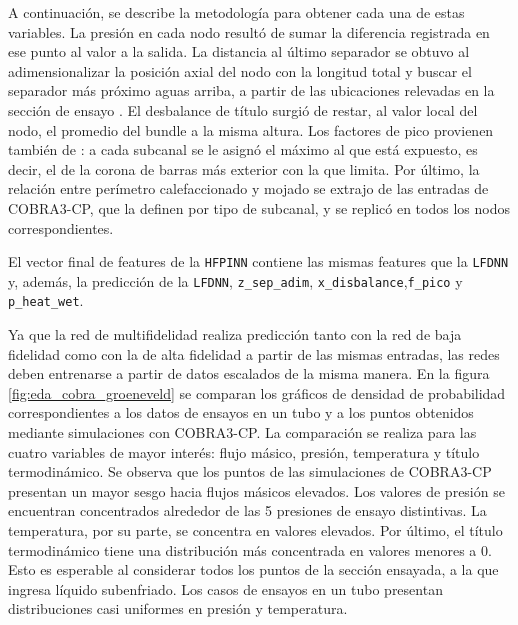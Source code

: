 A continuación, se describe la metodología para obtener cada una de estas variables. La presión en cada nodo resultó de sumar la diferencia registrada en ese punto al valor a la salida. La distancia al último separador se obtuvo al adimensionalizar la posición axial del nodo con la longitud total y buscar el separador más próximo aguas arriba, a partir de las ubicaciones relevadas en la sección de ensayo \citep{recopilacion_columbia}. El desbalance de título surgió de restar, al valor local del nodo, el promedio del bundle a la misma altura. Los factores de pico provienen también de \citep{recopilacion_columbia}: a cada subcanal se le asignó el máximo al que está expuesto, es decir, el de la corona de barras más exterior con la que limita. Por último, la relación entre perímetro calefaccionado y mojado se extrajo de las entradas de COBRA3-CP, que la definen por tipo de subcanal, y se replicó en todos los nodos correspondientes. 


El vector final de features de la \texttt{HFPINN} contiene las mismas features que la \texttt{LFDNN} y, además, la predicción de la \texttt{LFDNN}, \texttt{z\_sep\_adim}, \texttt{x\_disbalance},\break \texttt{f\_pico} y \texttt{p\_heat\_wet}.

Ya que la red de multifidelidad realiza predicción tanto con la red de baja fidelidad como con la de alta fidelidad a partir de las mismas entradas, las redes deben entrenarse a partir de datos escalados de la misma manera. En la figura \ref{fig:eda_cobra_groeneveld} se comparan los gráficos de densidad de probabilidad correspondientes a los datos de ensayos en un tubo y a los puntos obtenidos mediante simulaciones con COBRA3-CP. La comparación se realiza para las cuatro variables de mayor interés: flujo másico, presión, temperatura y título termodinámico. Se observa que los puntos de las simulaciones de COBRA3-CP presentan un mayor sesgo hacia flujos másicos elevados. Los valores de presión se encuentran concentrados alrededor de las 5 presiones de ensayo distintivas. La temperatura, por su parte, se concentra en valores elevados. Por último, el título termodinámico tiene una distribución más concentrada en valores menores a 0. Esto es esperable al considerar todos los puntos de la sección ensayada, a la que ingresa líquido subenfriado. Los casos de ensayos en un tubo presentan distribuciones casi uniformes en presión y temperatura.  

